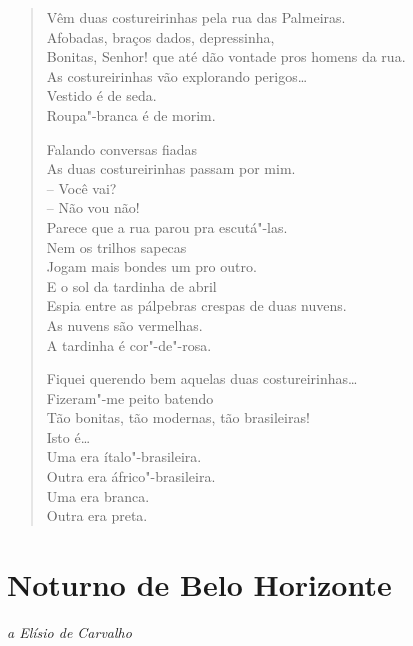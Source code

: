 \begin{verse}
Vêm duas costureirinhas pela rua das Palmeiras.\\
Afobadas, braços dados, depressinha,\\
Bonitas, Senhor! que até dão vontade pros homens da rua.\\
As costureirinhas vão explorando perigos\ldots{}\\
Vestido é de seda.\\
Roupa"-branca é de morim.

Falando conversas fiadas\\
As duas costureirinhas passam por mim.\\
-- Você vai?\\
\qquad\qquad{}-- Não vou não!\\
Parece que a rua parou pra escutá"-las.\\
Nem os trilhos sapecas\\
Jogam mais bondes um pro outro.\\
E o sol da tardinha de abril\\
Espia entre as pálpebras crespas de duas nuvens.\\
As nuvens são vermelhas.\\
A tardinha é cor"-de"-rosa.

Fiquei querendo bem aquelas duas costureirinhas\ldots{}\\
Fizeram"-me peito batendo\\
Tão bonitas, tão modernas, tão brasileiras!\\
Isto é\ldots{}\\
Uma era ítalo"-brasileira.\\
Outra era áfrico"-brasileira.\\
Uma era branca.\\
Outra era preta.
\end{verse}

\chapter[Noturno de Belo Horizonte]{Noturno de Belo Horizonte }

\begin{flushright}
\emph{a Elísio de Carvalho}
\end{flushright}

